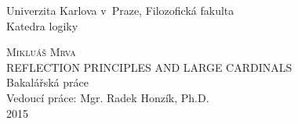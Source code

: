 \renewcommand{\theequation}{\thesection.\arabic{equation}}

\newenvironment{proof}
{\noindent \textit{Proof.}}
{\hspace*{\fill} $\Box$}

\newcommand{\toch}{\fbox{\small {\bf ??}}}
\newcommand{\bt}[1]{{\underset{\widetilde{}}{#1}}}
\newcommand{\trcl}[1]{\ensuremath{\mathrm{trcl}(\{#1\})}}
\newcommand{\cf}[1]{\ensuremath{\mathrm{cf}(#1)}}
\newcommand{\cl}[1]{\ensuremath{\mathrm{cl}}(#1)}
\newcommand{\ord}[1]{\ensuremath{\mathrm{ORD}}(#1)}
\newcommand{\dom}[1]{\ensuremath{\mathrm{dom}}(#1)}
\newcommand{\rng}[1]{\ensuremath{\mathrm{rng}}(#1)}
\newcommand{\power}[1]{\ensuremath{\mathscr{P}} (#1)}
\newcommand{\set}[2]{\ensuremath{\{#1 \,|\, #2 \}}}
\newcommand{\seq}[2]{\ensuremath{\langle #1 \,|\, #2 \rangle}}
\newcommand{\singl}[1]{\ensuremath{\{#1\}}}
\newcommand{\pair}[2]{\ensuremath{\{ #1, #2 \}}}
\newcommand{\restr}[2]{\ensuremath{#1 \! \upharpoonright \! #2}}
\renewcommand{\iff}{\leftrightarrow}
\newcommand{\Iff}{\Leftrightarrow}
\newcommand{\el}{\prec}
\newcommand{\iso}{\cong}
\newcommand{\sub}{\subseteq}
\newcommand{\super}{\supseteq}
\newcommand{\la}{\langle}
\newcommand{\ra}{\rangle}
\newcommand{\embed}{\rightarrow}
\newcommand{\mc}{\mathcal}
\newcommand{\supr}[1]{\mathrm{sup}\,#1}
\newcommand{\then}{\rightarrow}
\newcommand{\conc}{^{\smallfrown}}
\newcommand{\bb}{\mathbb}
\newcommand{\supp}[1]{\mathrm{supp}(#1)}
\newcommand{\beq}{\begin{equation}}
\newcommand{\eeq}{\end{equation}}
\newcommand{\brm}{\begin{remark}\begin{rm}}
\newcommand{\erm}{\end{rm}\end{remark}}
\newcommand{\mx}{\mathrm}
\newcommand{\bce}{\begin{compactenum}}
\newcommand{\ece}{\end{compactenum}}
\newcommand{\op}[2]{\la #1, #2 \ra}
\newcommand{\treq}{\trianglelefteq}
\newcommand{\et}{\mathrel{\&}}

\newcommand\defeq{\mathrel{\overset{\makebox[0pt]{\mbox{\normalfont\tiny\sffamily def}}}{=}}}


\begin{titlepage}
\Large
\begin{center}
Univerzita Karlova v~Praze, Filozofick{\/á} fakulta\\
Katedra logiky

\vspace{8.5em}
\textsc{Mikluáš Mrva}\\[1.4em]
{REFLECTION PRINCIPLES AND LARGE CARDINALS}\\
Bakalářská práce\\[6.8em]
Vedoucí práce: Mgr. Radek Honzík, Ph.D.\\[6.8em]
2015
\end{center}
\end{titlepage}\





